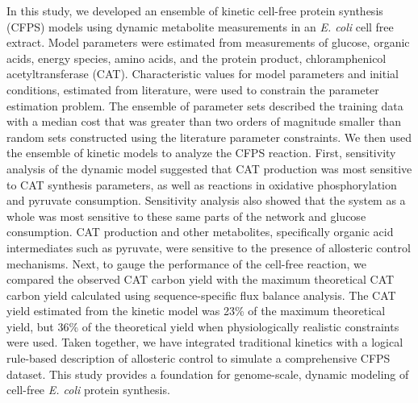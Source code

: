 \documentclass[12pt]{article}
\begin{document}
In this study, we developed an ensemble of kinetic cell-free protein synthesis (CFPS) models using dynamic metabolite measurements in an \textit{E. coli} cell free extract.
Model parameters were estimated from measurements of glucose, organic acids, energy species, amino acids, and the protein product, chloramphenicol acetyltransferase (CAT).
Characteristic values for model parameters and initial conditions, estimated from literature, were used to constrain the parameter estimation problem.
The ensemble of parameter sets described the training data with a median cost that was greater than two orders of magnitude smaller than random sets constructed using the literature parameter constraints. We then used the ensemble of kinetic models to analyze the CFPS reaction.
First, sensitivity analysis of the dynamic model suggested that CAT production was most sensitive to CAT synthesis parameters, as well as reactions in oxidative phosphorylation and pyruvate consumption.
Sensitivity analysis also showed that the system as a whole was most sensitive to these same parts of the network and glucose consumption.
CAT production and other metabolites, specifically organic acid intermediates such as pyruvate, were sensitive to the presence of allosteric control mechanisms.
Next, to gauge the performance of the cell-free reaction, we compared the observed CAT carbon yield with the maximum theoretical CAT carbon yield calculated using sequence-specific flux balance analysis. The CAT yield estimated from the kinetic model was 23\% of the maximum theoretical yield, but 36\% of the theoretical yield when physiologically realistic constraints were used. 
Taken together, we have integrated traditional kinetics with a logical rule-based description of allosteric control to simulate a comprehensive CFPS dataset.
This study provides a foundation for genome-scale, dynamic modeling of cell-free \textit{E. coli} protein synthesis.

\end{document}
